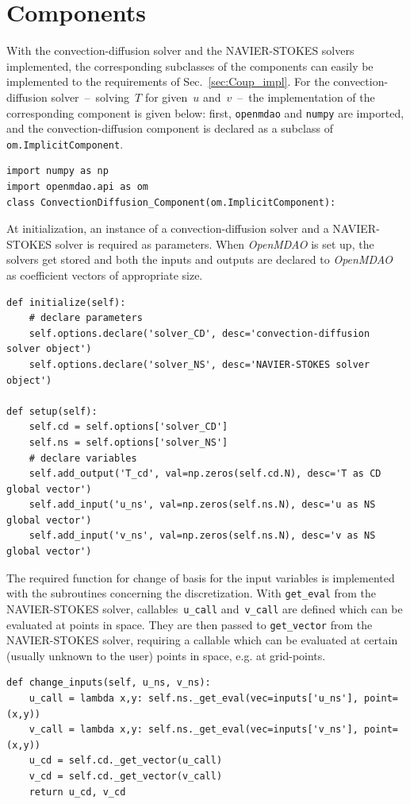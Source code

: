 \documentclass[10pt, ngerman, english,
twoside, open=right,
numbers=noenddot,
declaration=section,
abstract=section,
abstract=multiple,
abstract=notoc,
declaration=notoc,
cd=pale, 
chapterprefix=off, 
chapterpage=false, 
headingsvskip=-10em,
cdgeometry=custom, 
slantedgreek=on,
cdmath=on, 
cdfont=on,
ttfont=false,
mathswap=off,
]{tudscrreprt}
\numberwithin{equation}{chapter}
\renewcommand{\textsc}[1]{\uppercase{\mbox{#1}}}
\newcommand{\sidenote}[1]{
  \leavevmode %
  \marginpar{\hyphenpenalty=1000 \flushleft{\textcolor{HKS41}{#1}}}}
\begin{document}
\section{Components}\label{sec:Boussinesq_components}
\sidenote{Solver Components}With the convection-diffusion solver and the \textsc{Navier}-\textsc{Stokes} solvers implemented, the corresponding subclasses of the components can easily be implemented to the requirements of Sec.~\ref{sec:Coup_impl}. For the convection-diffusion solver~--~solving~$T$ for given~$u$ and~$v$~--~the implementation of the corresponding component is given below: 
first, \texttt{openmdao} and \texttt{numpy} are imported, and the convection-diffusion component is declared as a subclass of \texttt{om.ImplicitComponent}.
\begin{lstlisting}[firstnumber=1]
import numpy as np
import openmdao.api as om
class ConvectionDiffusion_Component(om.ImplicitComponent):
\end{lstlisting}
At initialization, an instance of a convection-diffusion solver and a \textsc{Navier}-\textsc{Stokes} solver is required as parameters. When \textit{OpenMDAO} is set up, the solvers get stored and both the inputs and outputs are declared to \textit{OpenMDAO} as coefficient vectors of appropriate size.
\begin{lstlisting}[firstnumber=4]
def initialize(self):
    # declare parameters
    self.options.declare('solver_CD', desc='convection-diffusion solver object')
    self.options.declare('solver_NS', desc='NAVIER-STOKES solver object')

def setup(self):
    self.cd = self.options['solver_CD']
    self.ns = self.options['solver_NS']
    # declare variables
    self.add_output('T_cd', val=np.zeros(self.cd.N), desc='T as CD global vector')
    self.add_input('u_ns', val=np.zeros(self.ns.N), desc='u as NS global vector')
    self.add_input('v_ns', val=np.zeros(self.ns.N), desc='v as NS global vector')
\end{lstlisting}
The required function for change of basis for the input variables is implemented with the subroutines concerning the discretization. With \texttt{get\_eval} from the \textsc{Navier}-\textsc{Stokes} solver, callables~\texttt{u\_call} and~\texttt{v\_call} are defined which can be evaluated at points in space. They are then passed to \texttt{get\_vector} from the \textsc{Navier}-\textsc{Stokes} solver, requiring a callable which can be evaluated at certain (usually unknown to the user) points in space, e.g. at grid-points.\newpage
\begin{lstlisting}[firstnumber=16]
def change_inputs(self, u_ns, v_ns):
    u_call = lambda x,y: self.ns._get_eval(vec=inputs['u_ns'], point=(x,y))
    v_call = lambda x,y: self.ns._get_eval(vec=inputs['v_ns'], point=(x,y))
    u_cd = self.cd._get_vector(u_call)
    v_cd = self.cd._get_vector(v_call)
    return u_cd, v_cd
\end{lstlisting}
\end{document}
